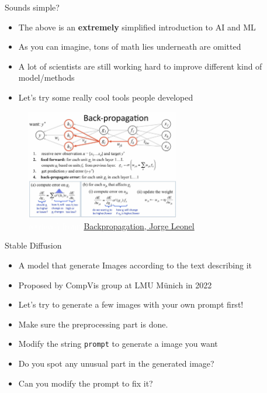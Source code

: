 \documentclass[10pt,xcolor={table,dvipsnames},t]{beamer}
\begin{document}
\begin{frame}{Sounds simple?}
  \begin{itemize}
    \item The above is an \textbf{extremely} simplified introduction to AI and ML
    \item As you can imagine, tons of math lies underneath are omitted
    \item A lot of scientists are still working hard to improve different kind of model/methods
    \item Let's try some really cool tools people developed
  \end{itemize}
  \begin{figure}
    \includegraphics[width=0.6\textwidth]{img/BackPropagation.png}
    \caption{\textcolor{white}{retrieved from:} \href{https://medium.com/@jorgesleonel/backpropagation-cc81e9c772fd}{Backpropagation, Jorge Leonel}}
  \end{figure}
\end{frame}

\begin{frame}{Stable Diffusion}
  \begin{itemize}
    \item A model that generate Images according to the text describing it
    \item Proposed by CompVis group at LMU M\"{u}nich in 2022
    \item Let's try to generate a few images with your own prompt first!
    \item Make sure the preprocessing part is done.
    \item Modify the string \texttt{prompt} to generate a image you want
    \item Do you spot any unusual part in the generated image?
    \item Can you modify the prompt to fix it?
  \end{itemize}
\end{frame}
\end{document}
